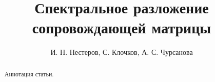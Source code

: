 \documentclass[10pt,a4paper,oneside]{article}
\begin{document}
 
\title{Спектральное разложение сопровождающей матрицы}
\author{И. Н. Нестеров, С. Клочков, А. С. Чурсанова}

\makemytitle

\begin{abstract}
    Аннотация статьи.
\end{abstract}





\end{document}
